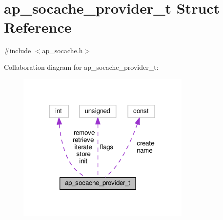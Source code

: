 \hypertarget{structap__socache__provider__t}{}\section{ap\+\_\+socache\+\_\+provider\+\_\+t Struct Reference}
\label{structap__socache__provider__t}


{\ttfamily \#include $<$ap\+\_\+socache.\+h$>$}



Collaboration diagram for ap\+\_\+socache\+\_\+provider\+\_\+t\+:
\nopagebreak
\begin{figure}[H]
\begin{center}
\leavevmode
\includegraphics[width=243pt]{structap__socache__provider__t__coll__graph}
\end{center}
\end{figure}
